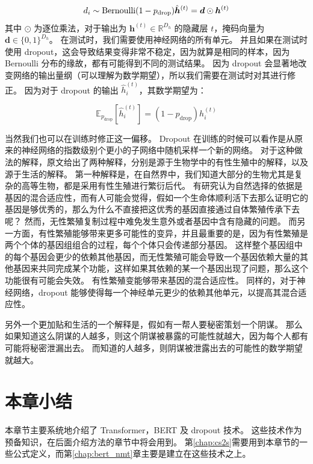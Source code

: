 \begin{equation}
	d_i \sim \text{Bernoulli}(1 - p_{\text{drop}}) \\
	\hat{\bm{h}}^{(t)} = \bm{d} \odot \bm{h}^{(t)}
\end{equation}
其中 $\odot$ 为逐位乘法，对于输出为 $\bm{h}^{(t)} \in \mathbb{R}^{D_h}$ 的隐藏层 $t$，掩码向量为 $\bm{d} \in \{0,1\}^{D_h}$。
在测试时，我们需要使用神经网络的所有单元。
并且如果在测试时使用 dropout，这会导致结果变得非常不稳定，因为就算是相同的样本，因为 Bernoulli 分布的缘故，都有可能得到不同的测试结果。
因为 dropout 会显著地改变网络的输出量纲（可以理解为数学期望），所以我们需要在测试时对其进行修正。
因为对于 dropout 的输出 $\hat{h}^{(t)}_i$，其数学期望为：

\begin{equation}
	\mathbb{E}_{p_{\text{drop}}} [\hat{h}^{(t)}_i] = (1 - p_{\text{drop}}) h_i^{(t)}
\end{equation}

当然我们也可以在训练时修正这一偏移。
Dropout 在训练的时候可以看作是从原来的神经网络的指数级别个更小的子网络中随机采样一个新的网络。
对于这种做法的解释，原文给出了两种解释，分别是源于生物学中的有性生殖中的解释，以及源于生活的解释。
第一种解释是，在自然界中，我们知道大部分的生物尤其是复杂的高等生物，都是采用有性生殖进行繁衍后代。
有研究认为自然选择的依据是基因的混合适应性，而有人可能会觉得，假如一个生命体顺利活下去那么证明它的基因是够优秀的，那么为什么不直接把这优秀的基因直接通过自体繁殖传承下去呢？
然而，无性繁殖复制过程中难免发生意外或者基因中含有隐藏的问题。
而另一方面，有性繁殖能够带来更多可能性的变异，并且最重要的是，因为有性繁殖是两个个体的基因组组合的过程，每个个体只会传递部分基因。
这样整个基因组中的每个基因会更少的依赖其他基因，而无性繁殖可能会导致一个基因依赖大量的其他基因来共同完成某个功能，这样如果其依赖的某一个基因出现了问题，那么这个功能很有可能会失效。
有性繁殖变能够带来基因的混合适应性。
同样的，对于神经网络，dropout 能够使得每一个神经单元更少的依赖其他单元，以提高其混合适应性。

另外一个更加贴和生活的一个解释是，假如有一帮人要秘密策划一个阴谋。
那么如果知道这么阴谋的人越多，则这个阴谋被暴露的可能性就越大，因为每个人都有可能将秘密泄漏出去。
而知道的人越多，则阴谋被泄露出去的可能性的数学期望就越大。

\section{本章小结}

本章节主要系统地介绍了 Transformer，BERT 及 dropout 技术。
这些技术作为预备知识，在后面介绍方法的章节中将会用到。
第\ref{chap:cs2s}需要用到本章节的一些公式定义，而第\ref{chap:bert_nmt}章主要是建立在这些技术之上。


